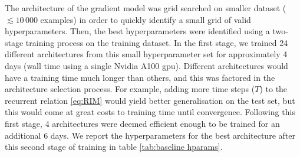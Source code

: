 \documentclass[twocolumn]{aastex631}
\begin{document}
The architecture of the gradient model was grid searched on 
smaller dataset ($\lesssim 10\,000$ examples) 
in order to quickly identify a small grid 
of valid hyperparameters. Then, the best hyperparameters were 
identified using a two-stage training process on the training dataset. 
In the first stage, we trained 24 different architectures from this small 
hyperparameter set for approximately 4 days (wall time using a single Nvidia A100 gpu). 
Different architectures would have a training time much longer than others, and this 
was factored in the architecture selection process. For example, adding more time 
steps ($T$) to the recurrent relation \eqref{eq:RIM} 
would yield better generalisation on the test set, but this 
would come at great costs to training time until convergence. 
Following this first stage, 4 architectures were deemed efficient enough 
to be trained for an additional 6 days. We report the hyperparameters for 
the best architecture after this second stage of training in table \ref{tab:baseline hparams}.
\end{document}
